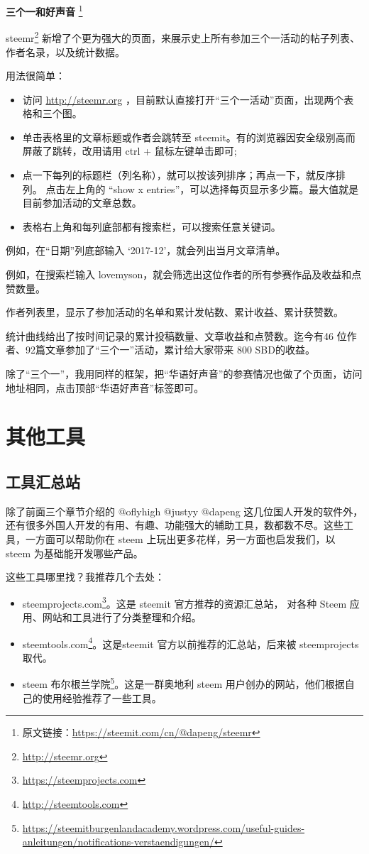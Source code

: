 \documentclass[]{ctexbook}
\renewcommand{\href}[2]{#2\footnote{\url{#1}}}
\begin{document}
\textbf{三个一和好声音} \footnote{原文链接：\url{https://steemit.com/cn/@dapeng/steemr}}

\href{http://steemr.org}{steemr} 新增了个更为强大的页面，来展示史上所有参加三个一活动的帖子列表、作者名录，以及统计数据。

用法很简单：

\begin{itemize}
\item
  访问 \url{http://steemr.org} ，目前默认直接打开``三个一活动''页面，出现两个表格和三个图。
\item
  单击表格里的文章标题或作者会跳转至 steemit。有的浏览器因安全级别高而屏蔽了跳转，改用请用 ctrl + 鼠标左键单击即可;
\item
  点一下每列的标题栏（列名称），就可以按该列排序；再点一下，就反序排列。
  点击左上角的 ``show x entries''，可以选择每页显示多少篇。最大值就是目前参加活动的文章总数。
\item
  表格右上角和每列底部都有搜索栏，可以搜索任意关键词。
\end{itemize}

例如，在``日期''列底部输入 `2017-12'，就会列出当月文章清单。

例如，在搜索栏输入 lovemyson，就会筛选出这位作者的所有参赛作品及收益和点赞数量。

作者列表里，显示了参加活动的名单和累计发帖数、累计收益、累计获赞数。

统计曲线给出了按时间记录的累计投稿数量、文章收益和点赞数。迄今有46 位作者、92篇文章参加了``三个一''活动，累计给大家带来 800 SBD的收益。

除了``三个一''，我用同样的框架，把``华语好声音''的参赛情况也做了个页面，访问地址相同，点击顶部``华语好声音''标签即可。

\section{其他工具}

\subsection{工具汇总站}

除了前面三个章节介绍的 @oflyhigh @justyy @dapeng 这几位国人开发的软件外，还有很多外国人开发的有用、有趣、功能强大的辅助工具，数都数不尽。这些工具，一方面可以帮助你在 steem 上玩出更多花样，另一方面也启发我们，以 steem 为基础能开发哪些产品。

这些工具哪里找？我推荐几个去处：

\begin{itemize}
\item
  \href{https://steemprojects.com}{steemprojects.com}。这是 steemit 官方推荐的资源汇总站， 对各种 Steem 应用、网站和工具进行了分类整理和介绍。
\item
  \href{http://steemtools.com}{steemtools.com}。这是steemit 官方以前推荐的汇总站，后来被 steemprojects 取代。
\item
  \href{https://steemitburgenlandacademy.wordpress.com/useful-guides-anleitungen/notifications-verstaendigungen/}{steem 布尔根兰学院}。这是一群奥地利 steem 用户创办的网站，他们根据自己的使用经验推荐了一些工具。
\end{itemize}
\end{document}
